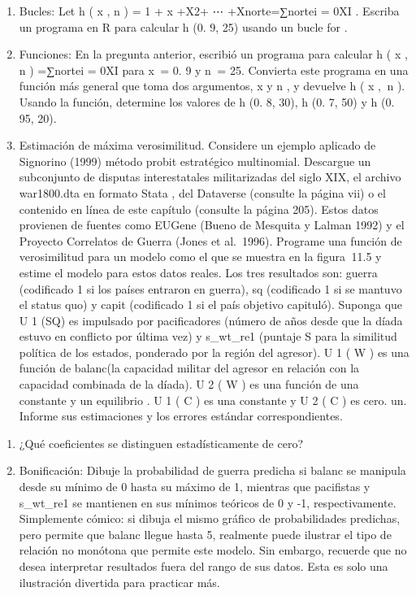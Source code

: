 \documentclass[
]{book}
\begin{document}
\begin{enumerate}
\def\labelenumi{\arabic{enumi}.}
\setcounter{enumi}{1}
\item
  Bucles: Let h ( x , n ) = 1 + x +X2+ ⋯ +Xnorte=∑nortei = 0XI . Escriba un programa en R para calcular h (0. 9, 25) usando un bucle for .
\item
  Funciones: En la pregunta anterior, escribió un programa para calcular h ( x , n ) =∑nortei = 0XI para x  = 0. 9 y n  = 25. Convierta este programa en una función más general que toma dos argumentos, x y n , y devuelve h ( x ,  n ). Usando la función, determine los valores de h (0. 8, 30), h (0. 7, 50) y h (0. 95, 20).
\item
  Estimación de máxima verosimilitud. Considere un ejemplo aplicado de Signorino (1999) método probit estratégico multinomial. Descargue un subconjunto de disputas interestatales militarizadas del siglo XIX, el archivo war1800.dta en formato Stata , del Dataverse (consulte la página vii) o el contenido en línea de este capítulo (consulte la página 205). Estos datos provienen de fuentes como EUGene (Bueno de Mesquita y Lalman 1992) y el Proyecto Correlatos de Guerra (Jones et al.~1996). Programe una función de verosimilitud para un modelo como el que se muestra en la figura  11.5 y estime el modelo para estos datos reales. Los tres resultados son: guerra (codificado 1 si los países entraron en guerra), sq (codificado 1 si se mantuvo el status quo) y capit (codificado 1 si el país objetivo capituló). Suponga que U 1 (SQ) es impulsado por pacificadores (número de años desde que la díada estuvo en conflicto por última vez) y s\_wt\_re1 (puntaje S para la similitud política de los estados, ponderado por la región del agresor). U 1 ( W ) es una función de balanc(la capacidad militar del agresor en relación con la capacidad combinada de la díada). U 2 ( W ) es una función de una constante y un equilibrio . U 1 ( C ) es una constante y U 2 ( C ) es cero.
  un.
  Informe sus estimaciones y los errores estándar correspondientes.
\end{enumerate}

\begin{enumerate}
\def\labelenumi{\Alph{enumi}.}
\setcounter{enumi}{1}
\item
  ¿Qué coeficientes se distinguen estadísticamente de cero?
\item
  Bonificación: Dibuje la probabilidad de guerra predicha si balanc se manipula desde su mínimo de 0 hasta su máximo de 1, mientras que pacifistas y s\_wt\_re1 se mantienen en sus mínimos teóricos de 0 y -1, respectivamente.
  Simplemente cómico: si dibuja el mismo gráfico de probabilidades predichas, pero permite que balanc llegue hasta 5, realmente puede ilustrar el tipo de relación no monótona que permite este modelo. Sin embargo, recuerde que no desea interpretar resultados fuera del rango de sus datos. Esta es solo una ilustración divertida para practicar más.
\end{enumerate}
\end{document}
